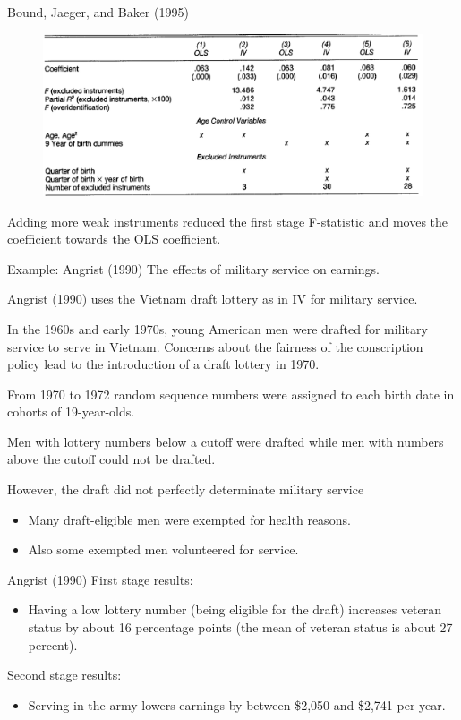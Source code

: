 \documentclass{beamer}
\begin{document}
\begin{frame}{Bound, Jaeger, and Baker (1995)}
\begin{figure}
\centering
\includegraphics[width=.9\linewidth]{./Figures/boundJaeger}
\end{figure}
Adding more weak instruments reduced the first stage F-statistic and moves the coefficient towards the OLS coefficient.
\end{frame}

\begin{frame}{Example: Angrist (1990)}
The effects of military service on earnings.\medskip

Angrist (1990) uses the Vietnam draft lottery as in IV for military
service.\medskip

In the 1960s and early 1970s, young American men were drafted for
military service to serve in Vietnam.
Concerns about the fairness of the conscription policy lead to the
introduction of a draft lottery in 1970.\medskip

From 1970 to 1972 random sequence numbers were assigned to each
birth date in cohorts of 19-year-olds.\medskip

Men with lottery numbers below a cutoff were drafted while men with
numbers above the cutoff could not be drafted.\medskip


However, the draft did not perfectly determinate military service
\begin{itemize}
\item Many draft-eligible men were exempted for health reasons.
\item Also some exempted men volunteered for service.
\end{itemize}

\end{frame}

\begin{frame}{Angrist (1990)}
First stage results:
\begin{itemize}
\item Having a low lottery number (being eligible for the draft) increases veteran status by about 16 percentage points (the mean of veteran status is about 27 percent).
\end{itemize}\medskip

Second stage results:
\begin{itemize}
\item Serving in the army lowers earnings by between \$2,050 and \$2,741
per year.
\end{itemize}
\end{frame}
\end{document}
